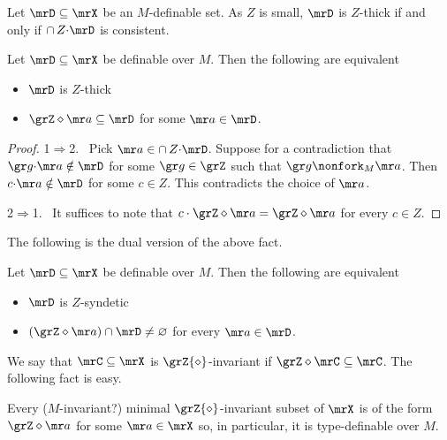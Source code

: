 
Let $\mrD\subseteq\mrX$ be an $M$-definable set.
As $Z$ is small, $\mrD$ is $Z$-thick if and only if $\cap\,Z{\cdot}\mrD$ is consistent.

\begin{fact}\label{fact_thick_circ}
  Let $\mrD\subseteq\mrX$ be definable over $M$.
  Then the following are equivalent
  \begin{itemize}
    \item [1.] $\mrD$ is $Z$-thick
    \item [2.] $\grZ\diamond {\mr a}\subseteq\mrD$ for some ${\mr a}\in\mrD$.
  \end{itemize}
\end{fact}

\begin{proof}
  1$\Rightarrow$2. \ 
  Pick ${\mr a}\in\cap\,Z{\cdot}\mrD$.
  Suppose for a contradiction that ${\gr g}{\cdot}{\mr a}\notin\mrD$ for some ${\gr g}\in\grZ$ such that ${\gr g}\nonfork_M {\mr a}$.
  Then $c{\cdot}{\mr a}\notin\mrD$ for some $c\in Z$.
  This contradicts the choice of ${\mr a}$.  

  2$\Rightarrow$1. \ 
  It suffices to note that $c\cdot\grZ\diamond {\mr a}=\grZ\diamond {\mr a}$ for every $c\in Z$.
\end{proof}

The following is the dual version of the above fact.

\begin{fact}
  Let $\mrD\subseteq\mrX$ be definable over $M$.
  Then the following are equivalent
  \begin{itemize}
    \item [1.] $\mrD$ is $Z$-syndetic
    \item [2.] $(\grZ\diamond {\mr a})\cap\mrD\neq\varnothing$ for every ${\mr a}\in\mrD$.
  \end{itemize}
\end{fact}

We say that $\mrC\subseteq\mrX$ is $\grZ{\diamond}$-invariant if $\grZ\diamond\mrC\subseteq\mrC$.
The following fact is easy.

\begin{fact}
  Every ($M$-invariant?) minimal $\grZ{\diamond}$-invariant subset of $\mrX$ is of the form $\grZ\diamond {\mr a}$ for some ${\mr a}\in\mrX$ so, in particular, it is type-definable over $M$.
\end{fact}

